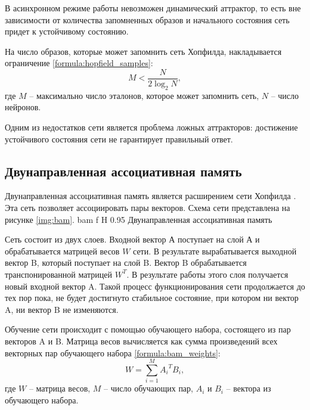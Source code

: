 В асинхронном режиме работы невозможен динамический аттрактор, то есть вне зависимости от количества запомненных образов и начального состояния сеть придет к устойчивому состоянию.

На число образов, которые может запомнить сеть Хопфилда, накладывается ограничение \ref{formula:hopfield_samples}:
\begin{equation}\label{formula:hopfield_samples}
	M < \frac{N}{2\log_2N},
\end{equation}
где $M$ -- максимально число эталонов, которое может запомнить сеть, $N$ -- число нейронов.

Одним из недостатков сети является проблема ложных аттракторов: достижение устойчивого состояния сети не гарантирует правильный ответ.

\subsection{Двунаправленная ассоциативная память}
Двунаправленная ассоциативная память является расширением сети Хопфилда \cite{бахтин2024интеллектуальные}.
Эта сеть позволяет ассоциировать пары векторов.
Схема сети представлена на рисунке \ref{img:bam}.
{bam} %
{f} %
{H} %
{0.95\textwidth} %
{Двунаправленная ассоциативная память} %

Сеть состоит из двух слоев.
Входной вектор А поступает на слой А и обрабатывается матрицей весов $W$ сети.
В результате вырабатывается выходной вектор B, который поступает на слой B.
Вектор B обрабатывается транспонированной матрицей $W^T$.
В результате работы этого слоя получается новый входной вектор A.
Такой процесс функционирования сети продолжается до тех пор пока, не будет достигнуто стабильное состояние, при котором ни вектор A, ни вектор B не изменяются.

Обучение сети происходит с помощью обучающего набора, состоящего из пар векторов A и B.
Матрица весов вычисляется как сумма произведений всех векторных пар обучающего набора \ref{formula:bam_weights}:
\begin{equation}\label{formula:bam_weights}
	W = \sum\limits_{i=1}^{M}{A_i}^T B_i,
\end{equation}
где $W$ -- матрица весов, $M$ -- число обучающих пар, $A_i$ и $B_i$ -- вектора из обучающего набора.

